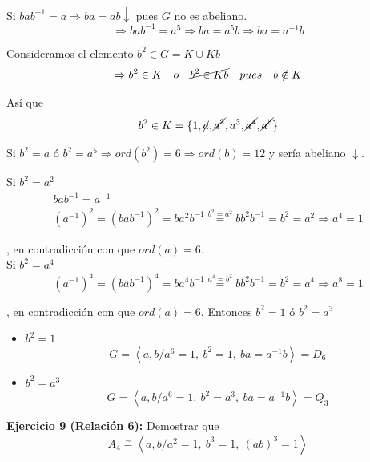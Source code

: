 \documentclass{article}
\begin{document}
Si $bab^{-1}=a\Rightarrow ba=ab\downarrow$ pues $G$ no es abeliano.
\begin{equation*}
\Rightarrow bab^{-1}=a^5\Rightarrow ba=a^5b\Rightarrow ba=a^{-1}b
\end{equation*}

Consideramos el elemento $b^2\in G=K\cup Kb$
\begin{equation*}
\Rightarrow b^2\in K\quad o\quad \cancel{b^2\in Kb}\quad pues\quad b\notin K
\end{equation*}

Así que
\begin{equation*}
b^2\in K=\{1,\cancel{a},\cancel{a^2},a^3,\cancel{a^4},\cancel{a^5}\}
\end{equation*}

Si $b^2=a$ ó $b^2=a^5\Rightarrow ord(b^2)=6\Rightarrow ord(b)=12$ y sería abeliano $\downarrow$.

Si $b^2=a^2$
\begin{gather*}
bab^{-1}=a^{-1}\\
(a^{-1})^2=(bab^{-1})^2=ba^2b^{-1}\overset{b^2=a^2}{=}bb^2b^{-1}=b^2=a^2\Rightarrow a^4=1
\end{gather*}

, en contradicción con que $ord(a)=6$.\\

Si $b^2=a^4$
\begin{equation*}
(a^{-1})^4=(bab^{-1})^4=ba^4b^{-1}\overset{a^4=b^2}{=}bb^2b^{-1}=b^2=a^4\Rightarrow a^8=1
\end{equation*}

, en contradicción con que $ord(a)=6$. Entonces $b^2=1$ ó $b^2=a^3$
\begin{itemize}
\item $b^2=1$
\begin{equation*}
G=\left\langle a,b/a^6=1,\:b^2=1,\:ba=a^{-1}b\right\rangle = D_6
\end{equation*}

\item $b^2=a^3$
\begin{equation*}
G=\left\langle a,b/a^6=1,\:b^2=a^3,\:ba=a^{-1}b\right\rangle=Q_3
\end{equation*}
\end{itemize}

\textbf{Ejercicio 9 (Relación 6):} Demostrar que
\begin{equation*}
A_4\overset{\sim}{=} \left\langle a,b/a^2=1,\:b^3=1,\:(ab)^3=1\right\rangle
\end{equation*}
\end{document}
